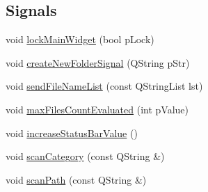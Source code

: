 \subsection*{Signals}
\begin{DoxyCompactItemize}
\item 
void \hyperlink{class_u_b_features_central_widget_aa61720e91d2184e1c2914c740f35ccaa}{lock\-Main\-Widget} (bool p\-Lock)
\item 
void \hyperlink{class_u_b_features_central_widget_ae46c098eb5527213e9652e2756ee7d96}{create\-New\-Folder\-Signal} (Q\-String p\-Str)
\item 
void \hyperlink{class_u_b_features_central_widget_aaa2325599335ead8e94bfa1c7c3b9bb0}{send\-File\-Name\-List} (const Q\-String\-List lst)
\item 
void \hyperlink{class_u_b_features_central_widget_a97d2360e499a84e7d9becea5a2cc464c}{max\-Files\-Count\-Evaluated} (int p\-Value)
\item 
void \hyperlink{class_u_b_features_central_widget_afdbbd5f3d482c718f2745aa09aec03d7}{increase\-Status\-Bar\-Value} ()
\item 
void \hyperlink{class_u_b_features_central_widget_a9b95c22434b5b29fec0fc4f71600a235}{scan\-Category} (const Q\-String \&)
\item 
void \hyperlink{class_u_b_features_central_widget_a628444fc22d2bbac92fcaada3b87e9ee}{scan\-Path} (const Q\-String \&)
\end{DoxyCompactItemize}
